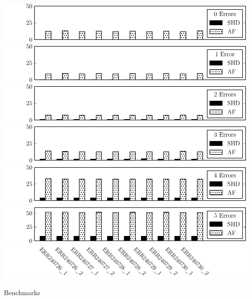 \documentclass[12pt]{standalone}
\begin{document}
\large
\pagestyle{empty}
\begin{minipage}{17cm}
\noindent
\includegraphics{0_errors.pdf}\break
\noindent
\vspace{-.625cm}\break
\includegraphics{1_errors.pdf}\break
\noindent
\vspace{-.625cm}\break
\includegraphics{2_errors.pdf}\break
\noindent
\vspace{-.625cm}\break
\includegraphics{3_errors.pdf}\break
\noindent
\vspace{-.625cm}\break
\includegraphics{4_errors.pdf}\break
\noindent
\vspace{-.625cm}\break
\includegraphics{5_errors.pdf}
\includegraphics{label.pdf}
\vspace{-1.75cm}\break
\begin{center} {\small Benchmarks} \end{center}
\end{minipage}
\end{document}
